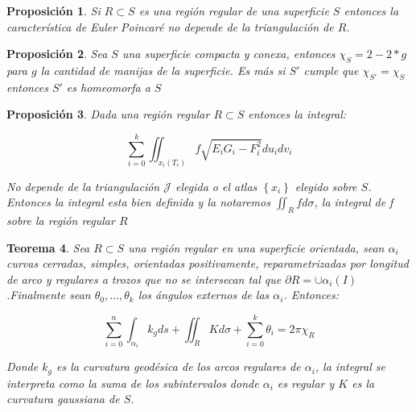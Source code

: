 \documentclass[11pt]{article}
\newcommand{\sett}[1]{\left\lbrace#1\right\rbrace}
\newtheorem{theorem}{Teorema}[section]
\newtheorem{proposition}[theorem]{Proposici\'on}
\begin{document}
\begin{proposition}
	Si $R \subset S$ es una regi\'on regular de una superficie $S$ entonces la caracter\'istica de Euler Poincar\'e no depende de la triangulaci\'on de $R$.
\end{proposition}

\begin{proposition}
	\label{valores de euler en superficies}
	Sea $S$ una superficie compacta y conexa, entonces $\chi_S = 2 - 2*g$ para $g$ la cantidad de manijas de la superficie. Es m\'as si $S'$ cumple que $\chi_{S'} = \chi_S$ entonces $S'$ es homeomorfa a $S$
\end{proposition}

\begin{proposition}
	\label{integral sobre region regular bien def}
	Dada una regi\'on regular $R \subset S$ entonces la integral:
	
	\[
	\sum\limits_{i=0}^{k}{\iint_{x_{i}(T_i)}{f \sqrt{E_iG_i - F_i^2}du_idv_i}}
	\]
	
	No depende de la triangulaci\'on $\mathcal{J}$ elegida o el atlas $\sett{x_{i}}$ elegido sobre $S$. Entonces la integral esta bien definida y la notaremos $\iint_{R}f d\sigma$, la \textit{integral de f sobre la regi\'on regular $R$}
\end{proposition}

\begin{theorem}
	\label{G-B global}
	Sea $R \subset S$ una regi\'on regular en una superficie orientada, sean $\alpha_i$ curvas cerradas, simples, orientadas positivamente, reparametrizadas por longitud de arco y regulares a trozos que no se intersecan tal que $\partial R = \cup \alpha_i(I)$.Finalmente sean $\theta_0, \dots, \theta_k$ los \'angulos externos de las $\alpha_i$. Entonces:
	
	\begin{equation*}
	\sum\limits_{i=0}^{n}\int_{\alpha_i} k_g ds + \iint_{R} Kd\sigma + \sum\limits_{i=0}^{k}{\theta_i} = 2\pi\chi_R
	\end{equation*}
	
	Donde $k_g$ es la curvatura geod\'esica de los arcos regulares de $\alpha_i$, la integral se interpreta como la suma de los subintervalos donde $\alpha_i$ es regular y $K$ es la curvatura gaussiana de $S$.
\end{theorem}
\end{document}
